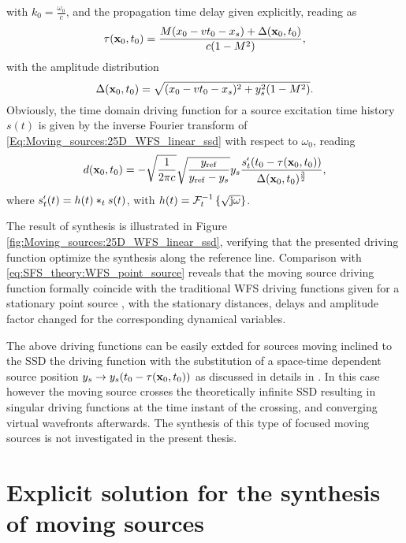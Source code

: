 with $k_0 = \frac{\omega_0}{c}$, and the propagation time delay given explicitly, reading as
\begin{equation}
\tau(\mathbf{x}_0,t_0) = \frac{M (x_0 - v t_0 - x_s )+\Delta(\mathbf{x}_0,t_0)}{c (1-M^2)}, 
\end{equation}
with the amplitude distribution
\begin{equation}
\Delta(\mathbf{x}_0,t_0) = \sqrt{(x_0 - v t_0 - x_s)^2 + y_s^2(1-M^2)}.
\end{equation}
Obviously, the time domain driving function for a source excitation time history $s(t)$ is given by the inverse Fourier transform of \eqref{Eq:Moving_sources:25D_WFS_linear_ssd} with respect to $\omega_0$, reading 
\begin{equation}
d(\mathbf{x}_0,t_0) = -
\sqrt{\frac{ 1 }{2\pi c} }
\sqrt{\frac{ y_{\mathrm{ref}} }{y_{\mathrm{ref}}-y_s}}
y_s
\frac{s^{\nshortmid}_t(t_0 - \tau( \mathbf{x}_0,t_0 ))}{\Delta(\mathbf{x}_0,t_0)^{\frac{3}{2}}},
\label{Eq:Moving_sources:25D_WFS_linear_ssd_td}
\end{equation}
where $s^{\nshortmid}_t(t) = h(t) \ast_{t} s(t)$, with $h(t) = \mathcal{F}^{-1}_t\left\{ \sqrt{\mathrm{j} \omega} \right\}$.

The result of synthesis is illustrated in Figure \eqref{fig:Moving_sources:25D_WFS_linear_ssd}, verifying that the presented driving function optimize the synthesis along the reference line.
Comparison with \eqref{eq:SFS_theory:WFS_point_source} reveals that the moving source driving function formally coincide with the traditional WFS driving functions given for a stationary point source \cite[(2.27)]{Verheijen1997:phd}, \cite[(3.16)\&(3.17)]{Start1997:phd} with the stationary distances, delays and amplitude factor changed for the corresponding dynamical variables.

The above driving functions can be easily extded for sources moving inclined to the SSD the driving function with the substitution of a space-time dependent source position $y_s \rightarrow y_s(t_0 - \tau(\mathbf{x}_0,t_0))$ as discussed in details in \cite{firtha2016wave}.
In this case however the moving source crosses the theoretically infinite SSD resulting in singular driving functions at the time instant of the crossing, and converging virtual wavefronts afterwards.
The synthesis of this type of focused moving sources is not investigated in the present thesis.

\section{Explicit solution for the synthesis of moving sources}

